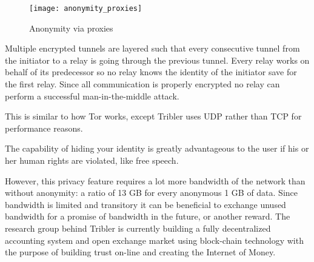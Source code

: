 \begin{figure}[h]
	\centering
	\texttt{[image: anonymity\_proxies]}
	\caption{Anonymity via proxies}
	\label{fig:anonymity_proxies}
\end{figure}

Multiple encrypted tunnels are layered such that every consecutive tunnel from the initiator to a relay is going through the previous tunnel.
Every relay works on behalf of its predecessor so no relay knows the identity of the initiator save for the first relay.
Since all communication is properly encrypted no relay can perform a successful man-in-the-middle attack.

This is similar to how Tor works, except Tribler uses UDP rather than TCP for performance reasons.

The capability of hiding your identity is greatly advantageous to the user if his or her human rights are violated, like free speech.

However, this privacy feature requires a lot more bandwidth of the network than without anonymity: a ratio of 13 GB for every anonymous 1 GB of data.
Since bandwidth is limited and transitory it can be beneficial to exchange unused bandwidth for a promise of bandwidth in the future, or another reward.
The research group behind Tribler is currently building a fully decentralized accounting system and open exchange market using block-chain technology with the purpose of building trust on-line and creating the Internet of Money.



